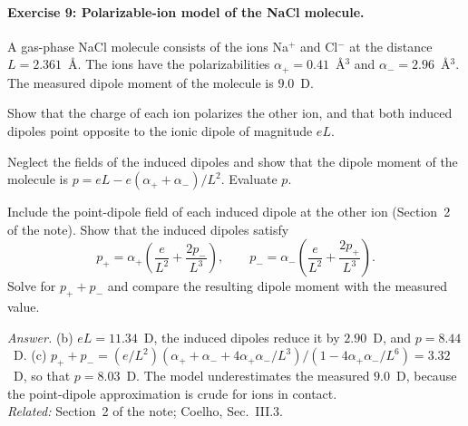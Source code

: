 \documentclass[11pt]{article}      %
\numberwithin{equation}{section}   %
\begin{document}
\paragraph{Exercise 9: Polarizable-ion model of the NaCl molecule.}
A gas-phase NaCl molecule consists of the ions Na$^+$ and Cl$^-$ at the distance $L = 2.361$~\AA. The ions have the polarizabilities $\alpha_+ = 0.41$~\AA$^3$ and $\alpha_- = 2.96$~\AA$^3$. The measured dipole moment of the molecule is $9.0$~D.
\begin{parts}
    \item Show that the charge of each ion polarizes the other ion, and that both induced dipoles point opposite to the ionic dipole of magnitude $eL$.
    \item Neglect the fields of the induced dipoles and show that the dipole moment of the molecule is $p = eL - e(\alpha_+ + \alpha_-)/L^2$. Evaluate $p$.
    \item Include the point-dipole field of each induced dipole at the other ion (Section~2 of the note). Show that the induced dipoles satisfy
    \begin{equation*}
        p_+ = \alpha_+\left(\frac{e}{L^2} + \frac{2p_-}{L^3}\right),
        \qquad
        p_- = \alpha_-\left(\frac{e}{L^2} + \frac{2p_+}{L^3}\right).
    \end{equation*}
    Solve for $p_+ + p_-$ and compare the resulting dipole moment with the measured value.
\end{parts}
\textit{Answer.} (b) $eL = 11.34$~D, the induced dipoles reduce it by $2.90$~D, and $p = 8.44$~D. (c) $p_+ + p_- = (e/L^2)\left(\alpha_+ + \alpha_- + 4\alpha_+\alpha_-/L^3\right)/\left(1 - 4\alpha_+\alpha_-/L^6\right) = 3.32$~D, so that $p = 8.03$~D. The model underestimates the measured $9.0$~D, because the point-dipole approximation is crude for ions in contact.\\
\textit{Related:} Section~2 of the note; Coelho, Sec.~III.3.
\end{document}
